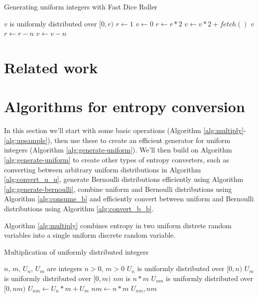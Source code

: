 \documentclass[12pt]{article}
\begin{document}
\begin{algorithm}
\caption{Generating uniform integers with Fast Dice Roller}
    \label{alg:fast-dice-roller}
\begin{algorithmic}[1]
    \Ensure $v$ is uniformly distributed over $[0,r)$
    \State $r \gets 1$
    \State $v \gets 0$
    \Loop
            \State $r \gets r * 2$
            \State $v \gets v * 2 + fetch()$
        \EndWhile
            \State \Return $v$
        \EndIf
        \State $r \gets r-n$
        \State $v \gets v-n$
    \EndLoop
\EndProcedure
\end{algorithmic}
\end{algorithm}


\section{Related work}


\section{Algorithms for entropy conversion}

In this section we'll start with some basic operations (Algorithm \ref{alg:multiply}-\ref{alg:upsample}), then use these to create an efficient generator for uniform integers (Algorithm \ref{alg:generate-uniform}). We'll then build on Algorithm \ref{alg:generate-uniform} to create other types of entropy converters, such as converting between arbitrary uniform distributions in Algorithm \ref{alg:convert_u_u}, generate Bernoulli distributions efficiently using Algorithm \ref{alg:generate-bernoulli}, combine uniform and Bernoulli distributions using Algorithm \ref{alg:consume_b} and efficiently convert between uniform and Bernoulli distributions using Algorithm \ref{alg:convert_b_b}.

Algorithm \ref{alg:multiply} combines entropy in two uniform distrete random variables into a single uniform discrete random variable.

\begin{algorithm}
\caption{Multiplication of uniformly distributed integers}
\label{alg:multiply}
\begin{algorithmic}[1]
    \Require $n$, $m$, $U_n$, $U_m$ are integers
    \Require $n>0$, $m>0$
    \Require $U_n$ is uniformly distributed over $[0,n)$
    \Require $U_m$ is uniformly distributed over $[0,m)$
    \Ensure $nm$ is $n * m$
    \Ensure $U_{nm}$ is uniformly distributed over $[0,nm)$
  \State $U_{nm} \gets U_n * m + U_m$
  \State $nm \gets n * m$
  \State \Return $U_{nm}, nm$
\EndProcedure
\end{algorithmic}
\end{algorithm}
\end{document}
